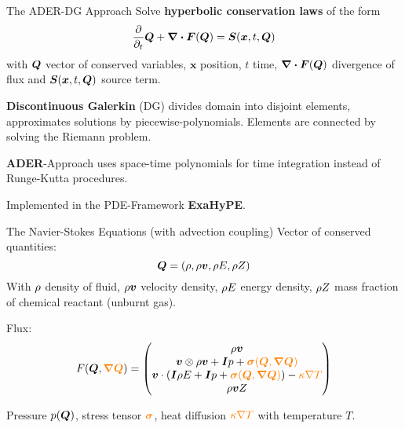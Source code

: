 \documentclass[aspectratio=169]{beamer}
\begin{document}
\begin{frame}{The ADER-DG Approach}
  Solve \textbf{hyperbolic conservation laws} of the form
\begin{equation}
  \label{eq:conservation-law}
 \frac{\partial}{\partial_t}  \Q + \divergence{\flux(\Q)} = \source(\bm{x}, t, \Q)
\end{equation}
with $\bm{Q}$ vector of conserved variables, $\bm{x}$ position, $t$ time,  $\divergence{\flux(\Q)}$ divergence of flux and $\source(\bm{x}, t, \Q)$ source term.

\textbf{Discontinuous Galerkin} (\textsc{DG}) divides domain into disjoint elements, approximates solutions by piecewise-polynomials.
Elements are connected by solving the Riemann problem.

\textbf{ADER}-Approach uses space-time polynomials for time integration instead of Runge-Kutta procedures.

Implemented in the \textsc{PDE}-Framework \textbf{ExaHyPE}.
\end{frame}

\begin{frame}{The Navier-Stokes Equations (with advection coupling)}
  Vector of conserved quantities:
\begin{equation}
  \label{eq:conserved-variables}
 \bm{Q} = \left( \rho, \rho \bm{v}, \rho E, \rho Z \right) 
\end{equation}
With $\rho$ density of fluid, $\rho \bm{v}$ velocity density, $\rho E$ energy density, $\rho Z$ mass fraction of chemical reactant (unburnt gas).

Flux:
\begin{equation}
  F(\Q, \textcolor{orange}{\gradQ}) = 
  \begin{pmatrix}
    \Qj \\
    \Qv  \otimes \Qj + \bm{I} \pressure + \textcolor{orange}{\stressT (\Q, \gradQ)}  \\
    \Qv \cdot \left(\bm{I} \QE + \bm{I} \pressure + \textcolor{orange}{\stressT (\Q, \gradQ)} \right) -
    \textcolor{orange}{\kappa \nabla T}\\
    \Qj \QZZ
  \end{pmatrix}
\end{equation}

Pressure $p(\bm{Q})$,
stress tensor $\textcolor{orange}{\bm{\sigma}}$, heat diffusion $\textcolor{orange}{\kappa \nabla T}$ with temperature $T$.
\end{frame}
\end{document}
